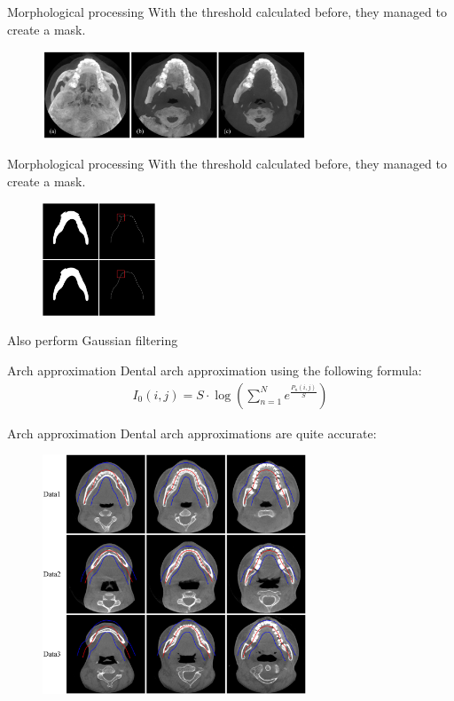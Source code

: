 \begin{frame}{\secname}{Morphological processing}
    With the threshold calculated before, they managed to create a mask.
    \begin{figure}
        \centering
        \includegraphics[width=0.7\textwidth]{img/dental_slices}
    \end{figure}
\end{frame}

\begin{frame}{\secname}{Morphological processing}
    With the threshold calculated before, they managed to create a mask.
    \begin{figure}
        \centering
        \includegraphics[width=0.3\textwidth]{img/dental_slice_thresh}
    \end{figure}
    Also perform Gaussian filtering
\end{frame}

\begin{frame}{\secname}{Arch approximation}
    Dental arch approximation using the following formula:
    \begin{gather*}
        I_0(i, j) = S \cdot \log \left( \sum_{n=1}^N e^{\frac{P_n(i,j)}{S}} \right)
    \end{gather*}
\end{frame}

\begin{frame}{\secname}{Arch approximation}
    Dental arch approximations are quite accurate:
    \begin{figure}
        \includegraphics[width=0.7\textwidth]{img/dental_arch.png}
    \end{figure}
\end{frame}


